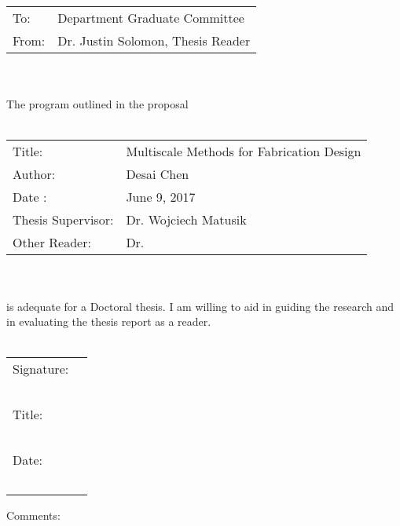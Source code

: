\documentclass[11pt]{article}
\begin{document}
\begin{tabular}{p{2cm} p{10cm}}
	To: & Department Graduate Committee \\
	From: & Dr. Justin Solomon, Thesis Reader
\end{tabular}\\~\\
The program outlined in the proposal\\~\\
\begin{tabular}{p{4cm} l}
	Title: & Multiscale Methods for Fabrication Design\\
	Author: & Desai Chen\\
	Date : & June 9, 2017 \\
	Thesis Supervisor: & Dr. Wojciech Matusik\\
	Other Reader: & Dr.
\end{tabular}\\~\\
is adequate for a Doctoral thesis. I am willing to aid in guiding the research and in
evaluating the thesis report as a reader.\\~\\
\begin{flushright}
	\begin{tabular}{l l}
		Signature: & \underline{\hspace{6cm}}\\~\\
		Title: & \underline{\hspace{6cm}}\\~\\
		Date: & \underline{\hspace{6cm}}\\~\\
	\end{tabular}
\end{flushright}
Comments:
\end{document}
